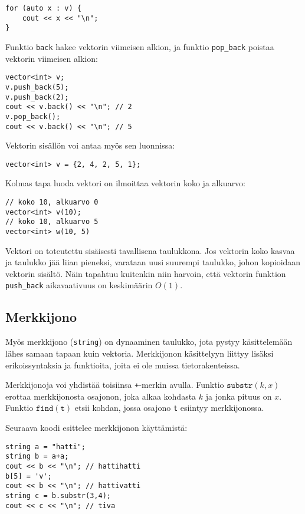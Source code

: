 \begin{lstlisting}
for (auto x : v) {
    cout << x << "\n";
}
\end{lstlisting}

Funktio \texttt{back} hakee vektorin viimeisen alkion,
ja funktio \texttt{pop\_back} poistaa vektorin
viimeisen alkion:

\begin{lstlisting}
vector<int> v;
v.push_back(5);
v.push_back(2);
cout << v.back() << "\n"; // 2
v.pop_back();
cout << v.back() << "\n"; // 5
\end{lstlisting}

Vektorin sisällön voi antaa myös sen luonnissa:

\begin{lstlisting}
vector<int> v = {2, 4, 2, 5, 1};
\end{lstlisting}

Kolmas tapa luoda vektori on ilmoittaa
vektorin koko ja alkuarvo:

\begin{lstlisting}
// koko 10, alkuarvo 0
vector<int> v(10);
// koko 10, alkuarvo 5
vector<int> w(10, 5)
\end{lstlisting}

Vektori on toteutettu sisäisesti tavallisena taulukkona.
Jos vektorin koko kasvaa ja taulukko jää liian pieneksi,
varataan uusi suurempi taulukko, johon kopioidaan
vektorin sisältö.
Näin tapahtuu kuitenkin niin harvoin, että vektorin
funktion \texttt{push\_back} aikavaativuus on
keskimäärin $O(1)$.

\subsection{Merkkijono}

Myös merkkijono (\texttt{string}) on dynaaminen taulukko,
jota pystyy käsittelemään lähes samaan
tapaan kuin vektoria.
Merkkijonon käsittelyyn liittyy lisäksi erikoissyntaksia
ja funktioita, joita ei ole muissa tietorakenteissa.

Merkkijonoja voi yhdistää toisiinsa \texttt{+}-merkin avulla.
Funktio $\texttt{substr}(k,x)$ erottaa merkkijonosta
osajonon, joka alkaa kohdasta $k$ ja jonka pituus on $x$.
Funktio $\texttt{find}(\texttt{t})$ etsii kohdan,
jossa osajono \texttt{t} esiintyy merkkijonossa.

Seuraava koodi esittelee merkkijonon käyttämistä:

\begin{lstlisting}
string a = "hatti";
string b = a+a;
cout << b << "\n"; // hattihatti
b[5] = 'v';
cout << b << "\n"; // hattivatti
string c = b.substr(3,4);
cout << c << "\n"; // tiva
\end{lstlisting}

